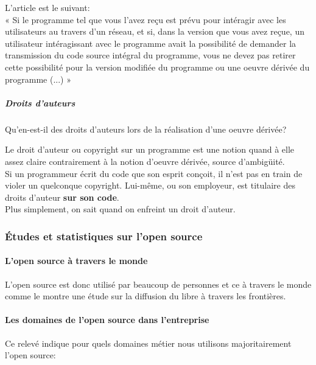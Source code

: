 						L'article est le suivant:\\

						« Si le programme tel que vous l'avez reçu est prévu pour intéragir avec les utilisateurs au travers d'un réseau, et si, dans la version que vous avez reçue, un  utilisateur intéragissant avec le programme avait la possibilité de demander la transmission du code source intégral du programme, vous ne devez pas retirer cette possibilité pour la version modifiée du programme ou une oeuvre dérivée du programme (...) »

					\subparagraph{Droits d'auteurs\\}

						Qu'en-est-il des droits d'auteurs lors de la réalisation d'une oeuvre dérivée?

						Le droit d'auteur ou copyright sur un programme est une notion quand à elle assez claire contrairement à la notion d'oeuvre dérivée, source d'ambigüité.\\

						Si un programmeur écrit du code que son esprit conçoit, il n'est pas en train de violer un quelconque copyright. Lui-même, ou son employeur, est titulaire des droits d'auteur \textbf{sur son code}.\\
						Plus simplement, on sait quand on enfreint un droit d'auteur.

			\subsubsection{Études et statistiques sur l'open source}

			\paragraph{L'open source à travers le monde\\}

				L'open source est donc utilisé par beaucoup de personnes et ce à travers le monde comme le montre une étude sur la diffusion du libre à travers les frontières.


			\paragraph{Les domaines de l'open source dans l'entreprise\\}

				Ce relevé indique pour quels domaines métier nous utilisons majoritairement l'open source:

